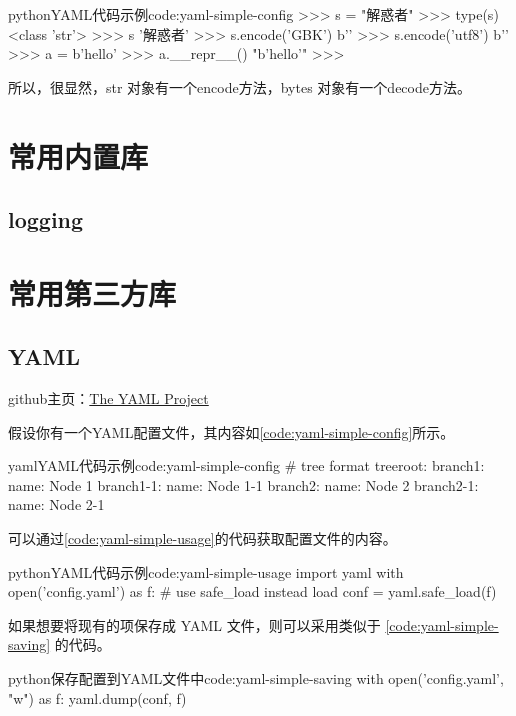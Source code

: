 \begin{jcode}{python}{YAML代码示例}{code:yaml-simple-config}
>>> s = "解惑者"
>>> type(s)
<class 'str'>
>>> s
'解惑者'
>>> s.encode('GBK')
b'\xbd{}\xbb{}\xdf'
>>> s.encode('utf8')
b''
>>> a = b'hello'
>>> a.__repr__()
"b'hello'"
>>>
\end{jcode}

所以，很显然，str 对象有一个encode方法，bytes 对象有一个decode方法。

\section{常用内置库}
\subsection{logging}


\section{常用第三方库}
\subsection{YAML}
github主页：\href{https://github.com/yaml}{The YAML Project}

假设你有一个YAML配置文件，其内容如\ref{code:yaml-simple-config}所示。

\begin{jcode}{yaml}{YAML代码示例}{code:yaml-simple-config}
# tree format
treeroot:
    branch1:
        name: Node 1
        branch1-1:
            name: Node 1-1
    branch2:
        name: Node 2
        branch2-1:
            name: Node 2-1
\end{jcode}

可以通过\ref{code:yaml-simple-usage}的代码获取配置文件的内容。

\begin{jcode}{python}{YAML代码示例}{code:yaml-simple-usage}
import yaml
with open('config.yaml') as f:
    # use safe_load instead load
    conf = yaml.safe_load(f)
\end{jcode}

如果想要将现有的项保存成 YAML 文件，则可以采用类似于 \ref{code:yaml-simple-saving} 的代码。
\begin{jcode}{python}{保存配置到YAML文件中}{code:yaml-simple-saving}
with open('config.yaml', "w") as f:
    yaml.dump(conf, f)
\end{jcode}



